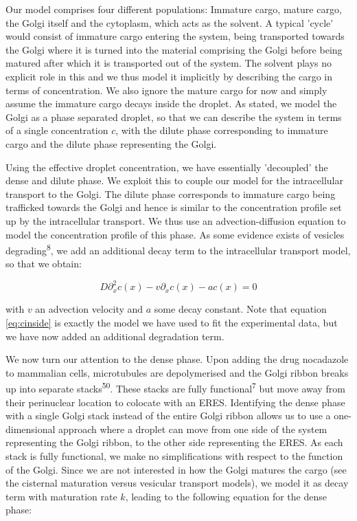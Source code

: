 \documentclass{Dissertate}
\begin{document}
Our model comprises four different populations: Immature
cargo, mature cargo, the Golgi itself and the cytoplasm, which acts as the solvent. A typical 'cycle' would consist of immature cargo entering the system, being transported towards the Golgi where it is turned into the material comprising the Golgi before being matured after which it is transported out of the system. The solvent plays no explicit role in this and we thus model it implicitly by describing the cargo in terms of concentration. We also ignore the mature cargo for now and simply assume the immature cargo decays inside the droplet. As stated, we model the Golgi as a phase separated droplet, so that we can describe the system in terms of a single concentration $c$, with the dilute phase corresponding to immature cargo and the dilute phase representing the Golgi.

Using the effective droplet concentration, we have essentially 'decoupled' the dense and dilute phase. We exploit this to couple our model for the intracellular transport to the Golgi. The dilute phase corresponds to immature cargo being trafficked towards the Golgi and hence is similar to the concentration profile set up by the intracellular transport. We thus use an advection-diffusion equation to model the concentration profile of this phase. As some evidence exists of vesicles degrading\textsuperscript{8}, we add an additional decay term to the intracellular transport model, so that we obtain:

\begin{equation}
D\partial_x^2 c(x) - v\partial_xc(x)-ac(x)=0
\label{eq:cinside}\end{equation}

with \(v\) an advection velocity and \(a\) some decay constant. Note that equation \ref{eq:cinside} is exactly the model we have used to fit the experimental data, but we have now added an additional degradation term.

We now turn our attention to the dense phase. Upon adding the drug nocadazole to mammalian cells, microtubules are depolymerised and the Golgi ribbon breaks up into separate stacks\textsuperscript{50}. These stacks are fully functional\textsuperscript{7} but move away from their perinuclear
location to colocate with an ERES. Identifying the dense phase with a single Golgi stack instead of the entire Golgi ribbon allows us to use a one-dimensional approach where a droplet can move from one side of the system representing the Golgi ribbon, to the other side representing the ERES. 
As each stack is fully functional, we make no simplifications with respect to the function of the Golgi. Since we are not interested in how the Golgi matures the cargo (see the cisternal maturation versus vesicular transport models), we model it as decay term with maturation rate $k$, leading to the following equation for the dense phase:
\end{document}
